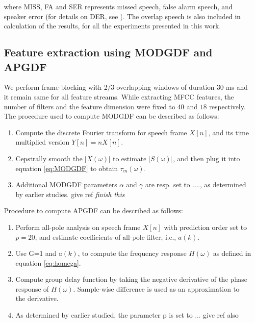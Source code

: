 \documentclass[conference]{IEEEtran}
\begin{document}
where MISS, FA and SER represents  missed speech, false alarm speech, and speaker error (for details on DER, see \cite{NIST}). The overlap speech is also included in calculation of the results, for all the experiments presented in this work. 

\subsection{Feature extraction using MODGDF and APGDF}

We perform frame-blocking with $2/3$-overlapping windows of duration 30 ms and it remain same for all feature streams. While extracting MFCC features, the number of filters and the feature dimension were fixed to $40$ and $18$ respectively. The procedure used to compute MODGDF can be described as follows:

\begin{enumerate}
\item Compute the discrete Fourier transform for speech frame $X[n]$, and its time
multiplied version $Y[n]=nX[n]$.
\item Cepstrally smooth the $|X(\omega)|$ to estimate $|S(\omega)|$,
and then plug it into equation \ref{eq:MODGDF} to obtain $\tau_{m}(\omega)$.
\item Additional MODGDF parameters $\alpha$ and $\gamma$ are resp. set to ....,
as determined by earlier studies. give ref
\textit{finish this}
\end{enumerate}	

\vspace{0.2cm}
Procedure to compute APGDF can be described as follows:
\begin{enumerate}
\item Perform all-pole analysis on speech frame $X[n]$ with prediction order set to
$p=20$, and estimate coefficients of all-pole filter, i.e., $a(k)$.  
\item Use G=1 and $a(k)$, to compute the frequency response $H(\omega)$ as defined
in equation \ref{eq:homega}.
\item Compute group delay function by taking the negative derivative of
the phase response of $H(\omega)$. Sample-wise
difference is used as an approximation to the derivative.
\item As determined by earlier studied, the parameter p is set to ... give ref
also
\end{enumerate}	
\vspace{0.2cm}
\end{document}
